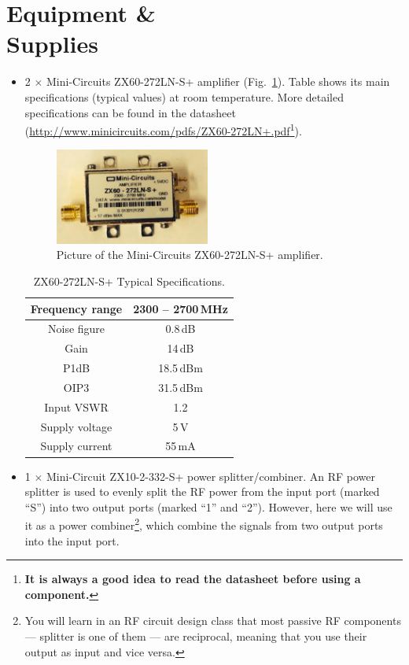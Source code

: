 \documentclass[letterpaper, 11pt]{article}
\begin{document}
\newpage
\section{Equipment \& \\Supplies}

\begin{itemize}[itemsep=0.5ex]
\item 2 $\times$ Mini-Circuits ZX60-272LN-S+ amplifier (Fig.~\ref{fig:amp-pic}). Table shows its main specifications (typical values) at room temperature. More detailed specifications can be found in the datasheet (\url{http://www.minicircuits.com/pdfs/ZX60-272LN+.pdf}\footnote{\textbf{It is always a good idea to read the datasheet before using a component.}}).

\begin{figure}[h]
	\centering
	\includegraphics[width=2in]{amp-pic}
	\caption{Picture of the Mini-Circuits ZX60-272LN-S+ amplifier.}
	\label{fig:amp-pic}
\end{figure}

\begin{table}[h]
	\centering
	\caption{ZX60-272LN-S+ Typical Specifications.}
	\renewcommand{\arraystretch}{1.2}
	\begin{tabular}{|c|c|}
		\hline  Frequency range & 2300 -- 2700\,MHz \\ 
		\hline  Noise figure & 0.8\,dB \\ 
		\hline  Gain & 14\,dB \\ 
		\hline  P1dB & 18.5\,dBm\\ 
		\hline  OIP3 & 31.5\,dBm \\ 
		\hline  Input VSWR & 1.2 \\ 
		\hline  Supply voltage & 5\,V \\ 
		\hline  Supply current & 55\,mA \\ 
		\hline 
	\end{tabular} 
\end{table}

\item 1 $\times$ Mini-Circuit ZX10-2-332-S+ power splitter/combiner. An RF power splitter is used to evenly split the RF power from the input port (marked ``S'') into two output ports (marked ``1'' and ``2''). However, here we will use it as a power combiner\footnote{You will learn in an RF circuit design class that most passive RF components --- splitter is one of them --- are reciprocal, meaning that you use their output as input and vice versa.}, which combine the signals from two output ports into the input port. 


\end{itemize}
\end{document}
